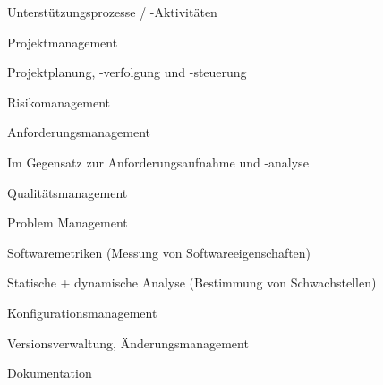 \documentclass[a4paper]{article}
\begin{document}
\begin{multicols}{3}
  Unterstützungsprozesse / -Aktivitäten
  \begin{itemize*}
    \item Projektmanagement
    \begin{itemize*}
      \item Projektplanung, -verfolgung und -steuerung
      \item Risikomanagement
    \end{itemize*}
    \item Anforderungsmanagement
    \begin{itemize*}
      \item Im Gegensatz zur Anforderungsaufnahme und -analyse
    \end{itemize*}
    \item Qualitätsmanagement
    \begin{itemize*}
      \item Problem Management
      \item Softwaremetriken (Messung von Softwareeigenschaften)
      \item Statische + dynamische Analyse (Bestimmung von Schwachstellen)
    \end{itemize*}
    \item Konfigurationsmanagement
    \begin{itemize*}
      \item Versionsverwaltung, Änderungsmanagement
    \end{itemize*}
    \item Dokumentation
  \end{itemize*}


\end{multicols}
\end{document}

